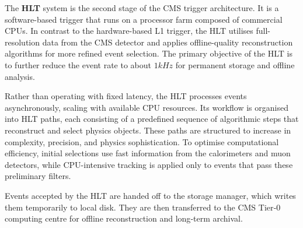 The \textbf{HLT} system is the second stage of the CMS trigger architecture. It is a software-based trigger that runs on a processor farm composed of commercial CPUs. In contrast to the hardware-based L1 trigger, the HLT utilises full-resolution data from the CMS detector and applies offline-quality reconstruction algorithms for more refined event selection. The primary objective of the HLT is to further reduce the event rate to about $1\unit{kHz}$ for permanent storage and offline analysis. 

Rather than operating with fixed latency, the HLT processes events asynchronously, scaling with available CPU resources. Its workflow is organised into HLT paths, each consisting of a predefined sequence of algorithmic steps that reconstruct and select physics objects. These paths are structured to increase in complexity, precision, and physics sophistication. To optimise computational efficiency, initial selections use fast information from the calorimeters and muon detectors, while CPU-intensive tracking is applied only to events that pass these preliminary filters. 

Events accepted by the HLT are handed off to the storage manager, which writes them temporarily to local disk. They are then transferred to the CMS Tier‑0 computing centre for offline reconstruction and long‑term archival.


